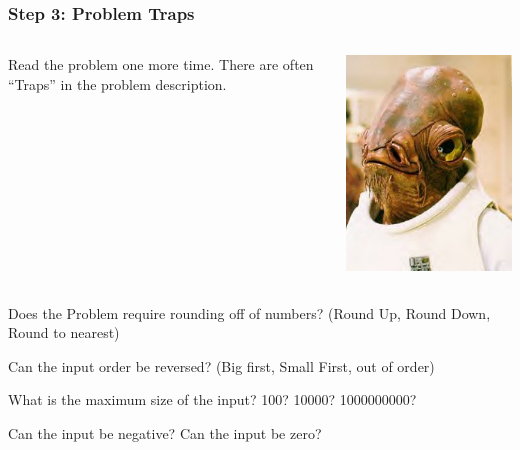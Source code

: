 \documentclass{beamer}
\begin{document}
\begin{frame}
  \frametitle{Step 3: Problem Traps}
  \begin{columns}[T]
    \begin{block}{}
      Read the problem one more time. There are often ``Traps'' in the
      problem description.
    \end{block}
    \includegraphics[width=1\textwidth]{img/ackbar}
  \end{columns}

  \begin{itemize}
    {\small
  \item Does the Problem require rounding off of numbers? (Round Up,
    Round Down, Round to nearest)
  \item Can the input order be reversed? (Big first, Small First, out of order)
  \item What is the maximum size of the input? 100? 10000? 1000000000?
  \item Can the input be negative? Can the input be zero?}
  \end{itemize}
\end{frame}
\end{document}
